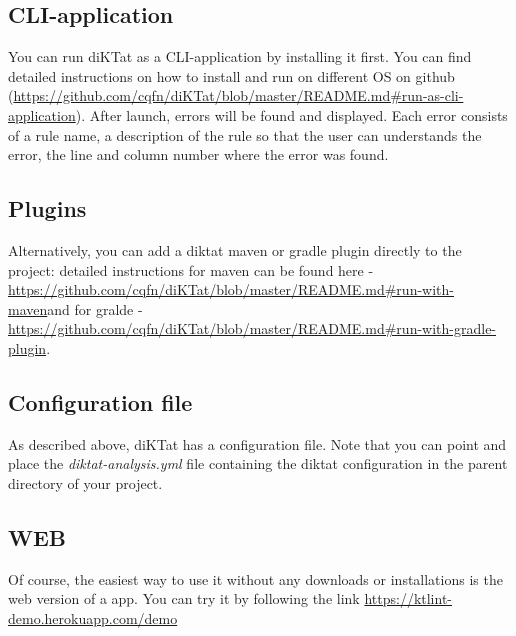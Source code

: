 \subsection{CLI-application}
\par You can run diKTat as a CLI-application by installing it first. You can find detailed instructions on how to install and run on different OS on github (\url{https://github.com/cqfn/diKTat/blob/master/README.md#run-as-cli-application}). After launch, errors will be found and displayed. Each error consists of a rule name, a description of the rule so that the user can understands the error, the line and column number where the error was found.\\
\subsection{Plugins}
\par Alternatively, you can add a diktat maven or gradle plugin directly to the project: detailed instructions for maven can be found here - \url{https://github.com/cqfn/diKTat/blob/master/README.md#run-with-maven}and for gralde - \url{https://github.com/cqfn/diKTat/blob/master/README.md#run-with-gradle-plugin}.\\
\subsection{Configuration file}
\par As described above, diKTat has a configuration file. Note that you can point and place the \textsl{diktat-analysis.yml} file containing the diktat configuration in the parent directory of your project.
\subsection{WEB}
\par Of course, the easiest way to use it without any downloads or installations is the web version of a app. You can try it by following the link \url{https://ktlint-demo.herokuapp.com/demo}
